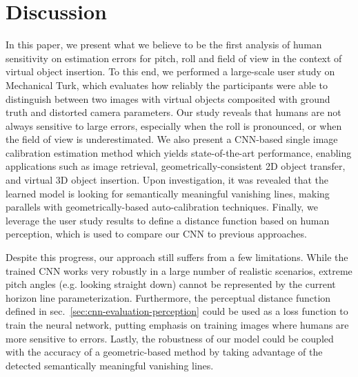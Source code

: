 
\section{Discussion}

In this paper, we present what we believe to be the first analysis of human sensitivity on estimation errors for pitch, roll and field of view in the context of virtual object insertion. To this end, we performed a large-scale user study on Mechanical Turk, which evaluates how reliably the participants were able to distinguish between two images with virtual objects composited with ground truth and distorted camera parameters. Our study reveals that humans are not always sensitive to large errors, especially when the roll is pronounced, or when the field of view is underestimated. We also present a CNN-based single image calibration estimation method which yields state-of-the-art performance, enabling applications such as image retrieval, geometrically-consistent 2D object transfer, and virtual 3D object insertion. Upon investigation, it was revealed that the learned model is looking for semantically meaningful vanishing lines, making parallels with geometrically-based auto-calibration techniques. Finally, we leverage the user study results to define a distance function based on human perception, which is used to compare our CNN to previous approaches.

Despite this progress, our approach still suffers from a few limitations. While the trained CNN works very robustly in a large number of realistic scenarios, extreme pitch angles (e.g. looking straight down) cannot be represented by the current horizon line parameterization. Furthermore, the perceptual distance function defined in sec.~\ref{sec:cnn-evaluation-perception} could be used as a loss function to train the neural network, putting emphasis on training images where humans are more sensitive to errors. Lastly, the robustness of our model could be coupled with the accuracy of a geometric-based method by taking advantage of the detected semantically meaningful vanishing lines.

